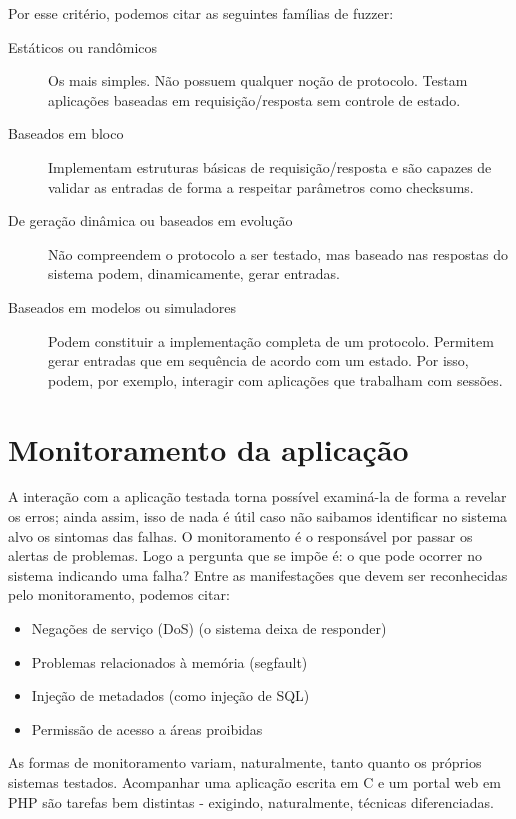 			
			Por esse critério, podemos citar as seguintes famílias de fuzzer:
			\begin{description}
				\item[Estáticos ou randômicos]
					Os mais simples. Não possuem qualquer noção de protocolo.
					Testam aplicações baseadas em requisição/resposta sem controle de estado.
				\item[Baseados em bloco]
					Implementam estruturas básicas de requisição/resposta e são
					capazes de validar as entradas de forma a respeitar
					parâmetros como checksums.
				\item[De geração dinâmica ou baseados em evolução]
					Não compreendem o protocolo a ser testado, mas baseado
					nas respostas do sistema podem, dinamicamente, gerar entradas.
				\item[Baseados em modelos ou simuladores]
					Podem constituir a implementação completa de um protocolo.
					Permitem gerar entradas que em sequência de acordo com um estado.
					Por isso, podem, por exemplo, interagir com aplicações
					que trabalham com sessões.
			\end{description}

		 

	\section{Monitoramento da aplicação}
		A interação com a aplicação testada torna possível examiná-la de forma
		a revelar os erros; ainda assim, isso de nada é útil caso não saibamos
		identificar no sistema alvo os sintomas das falhas.
		O monitoramento é o responsável por passar os alertas de problemas.
		Logo a pergunta que se impõe é: o que pode ocorrer no sistema
		indicando uma falha?
		Entre as manifestações que devem ser reconhecidas pelo monitoramento,
		podemos citar:
		\begin{itemize}
			\item{Negações de serviço (DoS) (o sistema deixa de responder)}
			\item{Problemas relacionados à memória (segfault)}
			\item{Injeção de metadados (como injeção de SQL)}
			\item{Permissão de acesso a áreas proibidas}
		\end{itemize}


		As formas de monitoramento variam, naturalmente, tanto quanto
		os próprios sistemas testados.
		Acompanhar uma aplicação escrita em C e um portal web em PHP
		são tarefas bem distintas - exigindo, naturalmente, técnicas diferenciadas.


